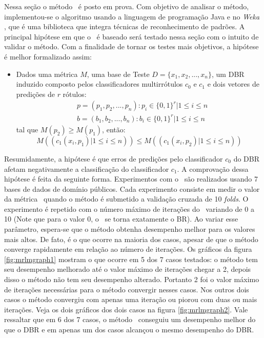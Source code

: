  Nessa seção o método \MRLMa~é posto em prova. Com objetivo de analisar o método, implementou-se o algoritmo
 usando a linguagem de programação Java e no \textit{Weka} \cite{weka},
 que é uma biblioteca que integra técnicas de reconhecimento de padrões.
 A principal hipótese em que o \MRLMa~é baseado será testado nessa seção com o intuito de validar o método.
 Com a finalidade de tornar os testes mais objetivos, a hipótese é melhor formalizado assim:
 \begin{itemize}

  \item Dados uma métrica $M$, uma base de Teste $D=\{x_1,x_2,...,x_n\}$,
  um DBR induzido composto pelos classificadores multirrótulos $c_0$ e $c_1$ e
  dois vetores de predições de $r$ rótulos:
  \begin{equation}
  \begin{split}
  & p=(p_1,p_2,...,p_n) : p_i \in {\{0,1\}}^r |1 \leq i \leq n \\
  & b=(b_1,b_2,...,b_n) : b_i \in {\{0,1\}}^r |1 \leq i \leq n
  \end{split}
  \end{equation}
  tal que $M(p_2) \geq M(p_1)$,
  então:
  \begin{equation}
  M((c_1(x_i,p_1) | 1 \leq i \leq n)) \leq M((c_1(x_i,p_2) | 1 \leq i \leq n))
  \end{equation}
 
 \end{itemize}

Resumidamente, a hipótese é que erros de predições pelo
classificador $c_0$ do DBR afetam negativamente a classificação do classificador $c_1$.
A comprovação dessa hipótese é feita da seguinte forma. Experimentos com o \MRLMa~são realizados
usando 7 bases de dados de domínio públicos. Cada experimento consiste em medir o valor da métrica
\SA~quando o método é submetido a validação cruzada de 10 \textit{folds}.
O experimento é repetido com o número máximo de iterações do
\MRLMa~variando de 0 a 10 (Note que para o valor 0, o \MRLMa~se torna exatamente o BR).
Ao variar esse parâmetro, espera-se que o método obtenha desempenho melhor para os valores mais altos.
De fato, é o que ocorre na maioria dos casos, apesar de que o método converge rapidamente em relação ao
número de iterações.
Os gráficos da figura \ref{fig:mrlmgraph1} mostram o que ocorre em 5 dos 7 casos testados: o método tem seu desempenho melhorado
até o valor máximo de iterações chegar a 2, depois disso o método não tem seu desempenho alterado.
Portanto 2 foi o valor máximo de iterações necessárias para o método convergir nesses casos.
Nos outros dois casos o método convergiu com apenas uma iteração ou piorou 
com duas ou mais iterações. Veja os dois gráficos dos dois casos na figura \ref{fig:mrlmgraph2}.
Vale ressaltar que em 6 dos 7 casos, 
o método \MRLMa~conseguiu um desempenho melhor do que o DBR e em apenas um dos casos
alcançou o mesmo desempenho do DBR.



